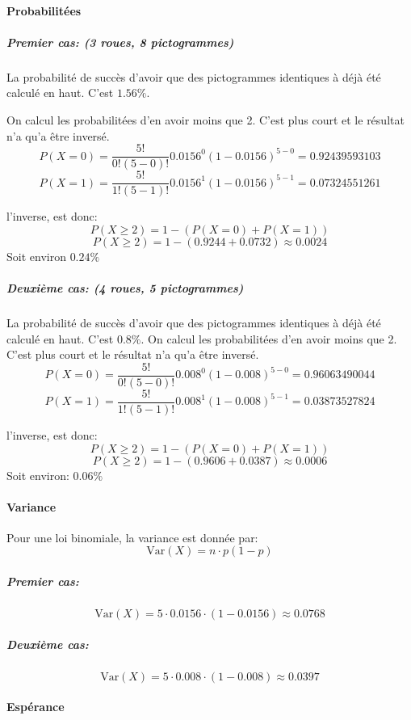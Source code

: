 \documentclass[11pt]{article}
\begin{document}
\paragraph{Probabilitées}\label{probabilituxe9es}

\subparagraph{Premier cas: (3 roues, 8
pictogrammes)}\label{premier-cas-3-roues-8-pictogrammes}

La probabilité de succès d'avoir que des pictogrammes identiques à déjà
été calculé en haut. C'est \(1.56\%\).

On calcul les probabilitées d'en avoir moins que 2. C'est plus court et
le résultat n'a qu'a être inversé. \[
P(X=0)=\frac{5!}{0!(5-0)!}0.0156^0(1-0.0156)^{5-0}=0.92439593103
\] \[
P(X=1)=\frac{5!}{1!(5-1)!}0.0156^1(1-0.0156)^{5-1}=0.07324551261
\]

l'inverse, est donc: \[
P(X \ge 2)=1 - (P(X=0)+P(X=1))
\] \[
P(X \ge 2)=1 - (0.9244 + 0.0732) \approx 0.0024
\] Soit environ \(0.24\%\)

\subparagraph{Deuxième cas: (4 roues, 5
pictogrammes)}\label{deuxiuxe8me-cas-4-roues-5-pictogrammes}

La probabilité de succès d'avoir que des pictogrammes identiques à déjà
été calculé en haut. C'est \(0.8\%\). On calcul les probabilitées d'en
avoir moins que 2. C'est plus court et le résultat n'a qu'a être
inversé. \[
P(X=0)=\frac{5!}{0!(5-0)!}0.008^0(1-0.008)^{5-0}=0.96063490044
\] \[
P(X=1)=\frac{5!}{1!(5-1)!}0.008^1(1-0.008)^{5-1}=0.03873527824
\]

l'inverse, est donc: \[
P(X \ge 2)=1 - (P(X=0)+P(X=1))
\] \[
P(X \ge 2)=1 - (0.9606 + 0.0387) \approx 0.0006
\] Soit environ: \(0.06\%\)

\paragraph{Variance}\label{variance}

Pour une loi binomiale, la variance est donnée par: \[
\mathrm{Var}(X)=n \cdot p (1-p)
\]

\subparagraph{Premier cas:}\label{premier-cas}

\[
\mathrm{Var}(X)=5 \cdot 0.0156 \cdot (1-0.0156) \approx 0.0768
\]

\subparagraph{Deuxième cas:}\label{deuxiuxe8me-cas}

\[
\mathrm{Var}(X)=5 \cdot 0.008 \cdot (1-0.008) \approx 0.0397
\]

\paragraph{Espérance}\label{espuxe9rance}
\end{document}
